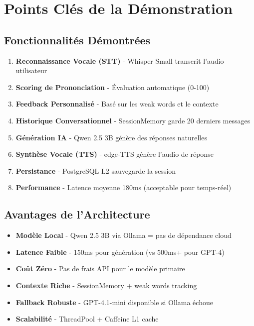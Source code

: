\documentclass[12pt,a4paper,oneside]{report}
\begin{document}
\newpage

\chapter{Points Clés de la Démonstration}

\section{Fonctionnalités Démontrées}

\begin{enumerate}
    \item \textbf{Reconnaissance Vocale (STT)} - Whisper Small transcrit l'audio utilisateur
    \item \textbf{Scoring de Prononciation} - Évaluation automatique (0-100)
    \item \textbf{Feedback Personnalisé} - Basé sur les weak words et le contexte
    \item \textbf{Historique Conversationnel} - SessionMemory garde 20 derniers messages
    \item \textbf{Génération IA} - Qwen 2.5 3B génère des réponses naturelles
    \item \textbf{Synthèse Vocale (TTS)} - edge-TTS génère l'audio de réponse
    \item \textbf{Persistance} - PostgreSQL L2 sauvegarde la session
    \item \textbf{Performance} - Latence moyenne 180ms (acceptable pour temps-réel)
\end{enumerate}

\section{Avantages de l'Architecture}

\begin{itemize}
    \item \textbf{Modèle Local} - Qwen 2.5 3B via Ollama = pas de dépendance cloud
    \item \textbf{Latence Faible} - 150ms pour génération (vs 500ms+ pour GPT-4)
    \item \textbf{Coût Zéro} - Pas de frais API pour le modèle primaire
    \item \textbf{Contexte Riche} - SessionMemory + weak words tracking
    \item \textbf{Fallback Robuste} - GPT-4.1-mini disponible si Ollama échoue
    \item \textbf{Scalabilité} - ThreadPool + Caffeine L1 cache
\end{itemize}
\end{document}
